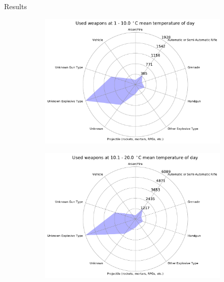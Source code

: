 \documentclass{beamer}
\begin{document}
\begin{frame}{Results}
\begin{figure}
\begin{subfigure}[b]{0.3\textwidth}
		\end{subfigure}
		\begin{subfigure}[b]{0.3\textwidth}
			\includegraphics[width=\textwidth]{Temp-Weapon/temp1-100_starDiagram}
		\end{subfigure}
	\end{figure}
	\begin{figure}
		\begin{subfigure}[b]{0.3\textwidth}
			\includegraphics[width=\textwidth]{Temp-Weapon/temp101-200_starDiagram}
		\end{subfigure}
		\begin{subfigure}[b]{0.3\textwidth}

\end{subfigure}
\end{figure}
\end{frame}
\end{document}
